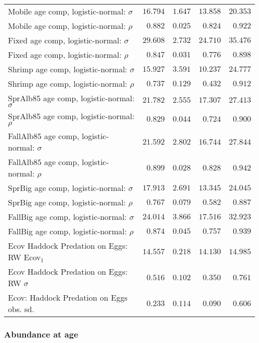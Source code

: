 \documentclass[
]{article}
\begin{document}
\begin{landscape}
\begin{longtable}[t]{lrrrr}
\addlinespace
Mobile age comp, logistic-normal: $\sigma$ & $16.794$ & $1.647$ & $13.858$ & $20.353$\\
Mobile age comp, logistic-normal: $\rho$ & $0.882$ & $0.025$ & $0.824$ & $0.922$\\
Fixed age comp, logistic-normal: $\sigma$ & $29.608$ & $2.732$ & $24.710$ & $35.476$\\
Fixed age comp, logistic-normal: $\rho$ & $0.847$ & $0.031$ & $0.776$ & $0.898$\\
Shrimp age comp, logistic-normal: $\sigma$ & $15.927$ & $3.591$ & $10.237$ & $24.777$\\
\addlinespace
Shrimp age comp, logistic-normal: $\rho$ & $0.737$ & $0.129$ & $0.432$ & $0.912$\\
SprAlb85 age comp, logistic-normal: $\sigma$ & $21.782$ & $2.555$ & $17.307$ & $27.413$\\
SprAlb85 age comp, logistic-normal: $\rho$ & $0.829$ & $0.044$ & $0.724$ & $0.900$\\
FallAlb85 age comp, logistic-normal: $\sigma$ & $21.592$ & $2.802$ & $16.744$ & $27.844$\\
FallAlb85 age comp, logistic-normal: $\rho$ & $0.899$ & $0.028$ & $0.828$ & $0.942$\\
\addlinespace
SprBig age comp, logistic-normal: $\sigma$ & $17.913$ & $2.691$ & $13.345$ & $24.045$\\
SprBig age comp, logistic-normal: $\rho$ & $0.767$ & $0.079$ & $0.582$ & $0.887$\\
FallBig age comp, logistic-normal: $\sigma$ & $24.014$ & $3.866$ & $17.516$ & $32.923$\\
FallBig age comp, logistic-normal: $\rho$ & $0.874$ & $0.045$ & $0.757$ & $0.939$\\
Ecov Haddock Predation on Eggs: RW Ecov$_1$ & $14.557$ & $0.218$ & $14.130$ & $14.985$\\
\addlinespace
Ecov Haddock Predation on Eggs: RW $\sigma$ & $0.516$ & $0.102$ & $0.350$ & $0.761$\\
Ecov: Haddock Predation on Eggs obs. sd. & $0.233$ & $0.114$ & $0.090$ & $0.606$\\*
\end{longtable}
\end{landscape}

\subsubsection{Abundance at age}\label{abundance-at-age}
\end{document}
